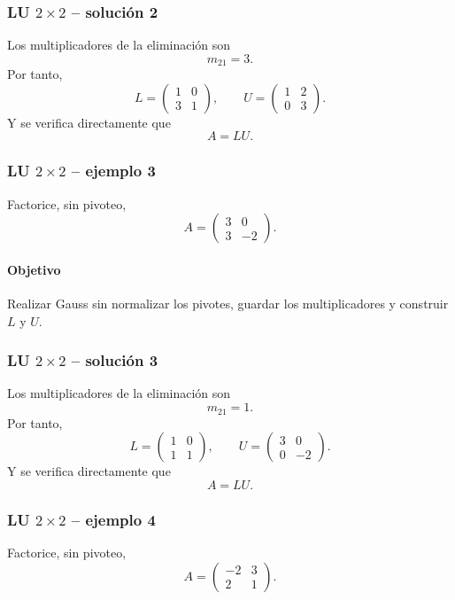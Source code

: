\subsubsection*{LU $2\times 2$ -- solución 2}

Los multiplicadores de la eliminación son
\[
m_{21}=3.
\]
Por tanto,
\[
L=\begin{pmatrix}1 & 0\\3 & 1\end{pmatrix},\qquad U=\begin{pmatrix}1 & 2\\0 & 3\end{pmatrix}.
\]
Y se verifica directamente que
\[
\boxed{A=LU}.
\]


\subsubsection*{LU $2\times 2$ -- ejemplo 3}

Factorice, sin pivoteo,
\[
A=\begin{pmatrix}3 & 0\\3 & -2\end{pmatrix}.
\]

\paragraph{Objetivo}
Realizar Gauss sin normalizar los pivotes, guardar los multiplicadores y construir $L$ y $U$.



\subsubsection*{LU $2\times 2$ -- solución 3}

Los multiplicadores de la eliminación son
\[
m_{21}=1.
\]
Por tanto,
\[
L=\begin{pmatrix}1 & 0\\1 & 1\end{pmatrix},\qquad U=\begin{pmatrix}3 & 0\\0 & -2\end{pmatrix}.
\]
Y se verifica directamente que
\[
\boxed{A=LU}.
\]


\subsubsection*{LU $2\times 2$ -- ejemplo 4}

Factorice, sin pivoteo,
\[
A=\begin{pmatrix}-2 & 3\\2 & 1\end{pmatrix}.
\]

